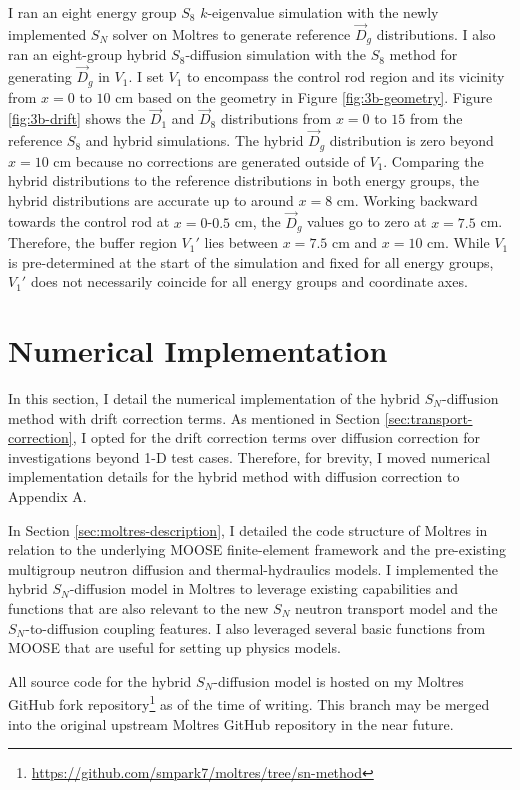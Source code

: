 I ran an eight energy group $S_8$ $k$-eigenvalue simulation with the newly implemented $S_N$ solver
on Moltres to generate reference $\vec{D}_g$ distributions. I also ran an eight-group hybrid
$S_8$-diffusion simulation with the $S_8$ method for generating $\vec{D}_g$ in $V_1$. I set $V_1$
to encompass the control rod region and its vicinity from $x=0$ to $10$ cm based on the geometry in
Figure \ref{fig:3b-geometry}. Figure \ref{fig:3b-drift} shows the $\vec{D}_1$ and $\vec{D}_8$
distributions from $x=0$ to $15$ from the reference $S_8$ and hybrid simulations. The hybrid
$\vec{D}_g$ distribution is zero beyond $x=10$ cm because no corrections are generated outside of
$V_1$. Comparing the hybrid distributions to the reference distributions in both energy groups, the
hybrid distributions are accurate up to around $x=8$ cm. Working backward towards the control rod
at $x=0$-$0.5$ cm, the $\vec{D}_g$ values go to zero at $x=7.5$ cm. Therefore, the buffer
region $V_1'$ lies between $x=7.5$ cm and $x=10$ cm. While $V_1$ is pre-determined at the start of
the simulation and fixed for all energy groups, $V_1'$ does not necessarily coincide for all
energy groups and coordinate axes.

\section{Numerical Implementation}

In this section, I detail the numerical implementation of the hybrid $S_N$-diffusion method with
drift correction terms. As mentioned in Section \ref{sec:transport-correction}, I opted for the
drift correction terms over diffusion correction for investigations beyond 1-D test cases.
Therefore, for brevity, I moved numerical implementation details for the hybrid method with
diffusion correction to Appendix A.

In Section \ref{sec:moltres-description}, I detailed the code structure of Moltres
\cite{lindsay_moltres_2017} in relation to the underlying \gls{MOOSE} finite-element framework
\cite{giudicelli_30_2024} and the pre-existing multigroup neutron diffusion and thermal-hydraulics
models. I implemented the hybrid $S_N$-diffusion model in Moltres to
leverage existing capabilities and functions that are also relevant to the new $S_N$ neutron
transport model and the $S_N$-to-diffusion coupling features. I also leveraged several basic
functions from \gls{MOOSE} that are useful for setting up physics models.

All source code for the hybrid $S_N$-diffusion model is hosted on my Moltres GitHub fork
repository\footnote{\url{https://github.com/smpark7/moltres/tree/sn-method}} as of the time of
writing. This branch may be merged into the original upstream Moltres GitHub repository in the near
future.


